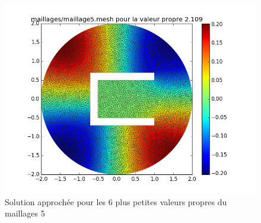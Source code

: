 \documentclass[a4paper,12pt]{article}
\begin{document}
\begin{figure}[H]
\begin{center}
        \includegraphics[scale = 0.3]{image/II/trace_6}
\end{center}
\caption{Solution approchée pour les 6 plus petites valeurs propres du maillages 5}
\end{figure}
\end{document}
